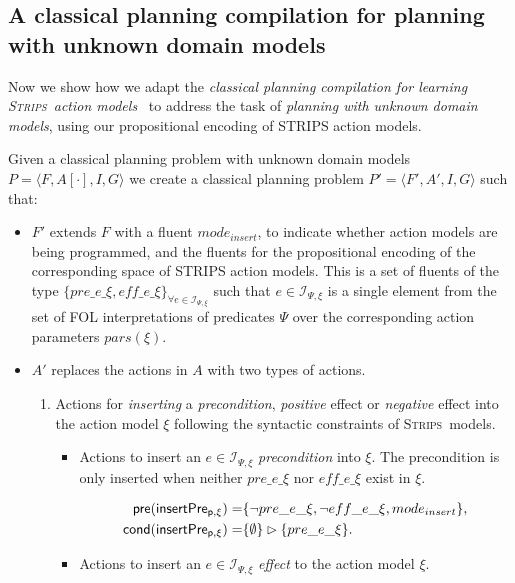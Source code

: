 \documentclass{article}
\newcommand{\tup}[1]{{\langle #1 \rangle}}
\newcommand{\pre}{\mathsf{pre}}     %
\newcommand{\cond}{\mathsf{cond}}   %
\newcommand{\strips}{\textsc{Strips}}
\begin{document}
\subsection{A classical planning compilation for planning with unknown domain models}
Now we show how we adapt the {\em classical planning compilation for learning \strips\ action models}~\cite{aineto2018learning} to address the task of {\em planning with unknown domain models}, using our propositional encoding of STRIPS action models.

Given a classical planning problem with unknown domain models $P=\tup{F,A[\cdot],I,G}$ we create a classical planning problem $P'=\tup{F',A',I,G}$ such that:
\begin{itemize}
\item $F'$ extends $F$ with a fluent $mode_{insert}$, to indicate whether action models are being programmed, and the fluents for the propositional encoding of the corresponding space of STRIPS action models. This is a set of fluents of the type $\{pre\_e\_\xi, eff\_e\_\xi\}_{\forall e\in{\mathcal I}_{\Psi,\xi}}$ such that $e\in{\mathcal I}_{\Psi,\xi}$ is a single element from the set of FOL interpretations of predicates $\Psi$ over the corresponding action parameters $pars(\xi)$. 

\item $A'$ replaces the actions in $A$ with two types of actions.
\begin{enumerate}
\item Actions for {\em inserting} a {\em precondition}, {\em positive} effect or {\em negative} effect into the action model $\xi$ following the syntactic constraints of \strips\ models. 
\begin{itemize}
\item Actions to insert an $e\in{\mathcal I}_{\Psi,\xi}$ {\em precondition} into $\xi$. The precondition is only inserted when neither $pre\_e\_\xi$ nor $eff\_e\_\xi$ exist in $\xi$.

\begin{small}
\begin{align*}
\hspace*{7pt}\pre(\mathsf{insertPre_{p,\xi}})=&\{\neg pre\_e\_\xi, \neg eff\_e\_\xi, mode_{insert}\},\\
\cond(\mathsf{insertPre_{p,\xi}})=&\{\emptyset\}\rhd\{pre\_e\_\xi\}.
\end{align*}
\end{small}

\item Actions to insert an $e\in{\mathcal I}_{\Psi,\xi}$ {\em effect} to the action model $\xi$. 


\end{itemize}
\end{enumerate}
\end{itemize}
\end{document}
